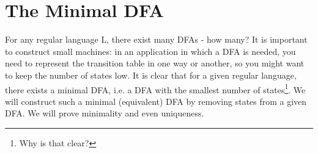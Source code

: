%  
%  
%  
%  

%  
%  

\section{The Minimal DFA}\label{minfsa}

For any regular language L, there exist many DFAs - how many? It is
important to construct small machines: in an application in which a
DFA is needed, you need to represent the transition table in one way
or another, so you might want to keep the number of states low. It is
clear that for a given regular language, there exists a minimal DFA,
i.e. a DFA with the smallest number of states\footnote{Why is that
clear?}. We will construct such a minimal (equivalent) DFA by removing
states from a given DFA. We will prove minimality and even uniqueness.

